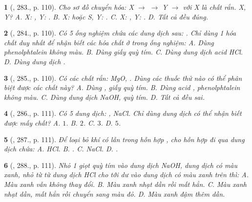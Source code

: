 \documentclass{article}
\newtheorem{baitoan}{}
\begin{document}
\begin{baitoan}[\cite{Nguyen_Buu_Can_500_BT_Hoa_Hoc_THCS}, 283., p. 110]
	Cho sơ đồ chuyển hóa: {\rm X $\to$  $\to$ Y $\to$ } với X là chất rắn. X, Y? {\rm{\sf A.} X: , Y: . {\sf B.} X:  hoặc S, Y: . {\rm C.} X: , Y: .} {\sf D.} Tất cả đều đúng.
\end{baitoan}

\begin{baitoan}[\cite{Nguyen_Buu_Can_500_BT_Hoa_Hoc_THCS}, 284., p. 110]
	Có 5 ống nghiệm chứa các dung dịch sau: {\rm{}}. Chỉ dùng 1 hóa chất duy nhất để nhận biết các hóa chất ở trong ống nghiệm: {\sf A.} Dùng phenolphtalein không màu. {\sf B.} Dùng giấy quỳ tím. {\sf C.} Dùng dung dịch acid {\rm HCl}. {\sf D.} Dùng dung dịch {\rm{}}.
\end{baitoan}

\begin{baitoan}[\cite{Nguyen_Buu_Can_500_BT_Hoa_Hoc_THCS}, 285., p. 110]
	Có các chất rắn: {\rm MgO, }. Dùng các thuốc thử nào có thể phân biệt được các chất này? {\sf A.} Dùng {\rm{}}, giấy quỳ tím. {\sf B.} Dùng acid {\rm{}}, phenolphtalein không màu. {\sf C.} Dùng dung dịch {\rm NaOH}, quỳ tím. {\sf D.} Tất cả đều sai.
\end{baitoan}

\begin{baitoan}[\cite{Nguyen_Buu_Can_500_BT_Hoa_Hoc_THCS}, 286., p. 111]
	Có 5 dung dịch: {\rm{}, NaCl}. Chỉ dùng dung dịch {\rm{}} có thể nhận biết được mấy chất? {\sf A.} $1$. {\sf B.} $2$. {\sf C.} $3$. {\sf D.} $5$.
\end{baitoan}

\begin{baitoan}[\cite{Nguyen_Buu_Can_500_BT_Hoa_Hoc_THCS}, 287., p. 111]
	Để loại bỏ khí {\rm{}} có lẫn trong hỗn hợp {\rm{}}, cho hỗn hợp đi qua dung dịch chứa: {\rm{\sf A.} HCl. {\sf B.} . {\sf C.} NaCl. {\sf D.} }.
\end{baitoan}

\begin{baitoan}[\cite{Nguyen_Buu_Can_500_BT_Hoa_Hoc_THCS}, 288., p. 111]
	Nhỏ 1 giọt quỳ tím vào dung dịch {\rm NaOH}, dung dịch có màu xanh, nhỏ từ từ dung dịch {\rm HCl} cho tới dư vào dung dịch có màu xanh trên thì: {\sf A.} Màu xanh vẫn không thay đổi. {\sf B.} Màu xanh nhạt dần rồi mất hẳn. {\sf C.} Màu xanh nhạt dần, mất hẳn rồi chuyển sang màu đỏ. {\sf D.} Màu xanh đậm thêm dần.
\end{baitoan}
\end{document}
